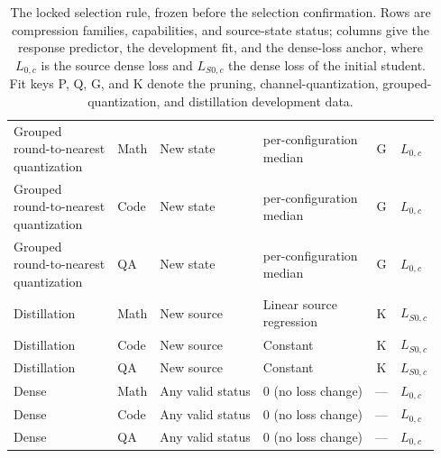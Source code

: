\begin{table}[!htbp]
\begin{tabular*}{\textwidth}{@{\extracolsep{\fill}}llllcl@{}}
\shortstack[l]{Grouped\\round-to-nearest\\quantization} & Math & New state & \shortstack[l]{per-configuration\\median} & G & $L_{0,c}$ \\
\shortstack[l]{Grouped\\round-to-nearest\\quantization} & Code & New state & \shortstack[l]{per-configuration\\median} & G & $L_{0,c}$ \\
\shortstack[l]{Grouped\\round-to-nearest\\quantization} & QA & New state & \shortstack[l]{per-configuration\\median} & G & $L_{0,c}$ \\
\addlinespace
Distillation & Math & New source & \shortstack[l]{Linear source\\regression} & K & $L_{S0,c}$ \\
Distillation & Code & New source & Constant & K & $L_{S0,c}$ \\
Distillation & QA & New source & Constant & K & $L_{S0,c}$ \\
\addlinespace
Dense & Math & Any valid status & 0 (no loss change) & --- & $L_{0,c}$ \\
Dense & Code & Any valid status & 0 (no loss change) & --- & $L_{0,c}$ \\
Dense & QA & Any valid status & 0 (no loss change) & --- & $L_{0,c}$ \\
\bottomrule
\end{tabular*}
\caption{The locked selection rule, frozen before the selection confirmation. Rows are compression families, capabilities, and source-state status; columns give the response predictor, the development fit, and the dense-loss anchor, where $L_{0,c}$ is the source dense loss and $L_{S0,c}$ the dense loss of the initial student. Fit keys P, Q, G, and K denote the pruning, channel-quantization, grouped-quantization, and distillation development data.}
\label{tab:locked_rule}
\end{table}
\begingroup\small
